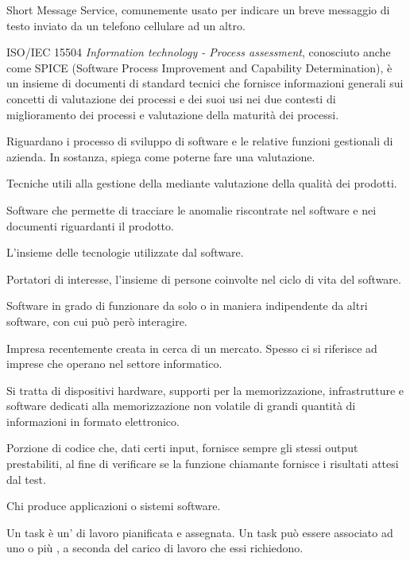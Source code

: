 Short Message Service, comunemente usato per indicare un breve messaggio di testo inviato da un telefono cellulare ad un altro.

ISO/IEC 15504 \emph{Information technology - Process assessment}, conosciuto anche come SPICE (Software Process Improvement and Capability Determination), è un insieme di documenti di standard tecnici che fornisce informazioni generali sui concetti di valutazione dei processi e dei suoi usi nei due contesti di miglioramento dei processi e valutazione della maturità dei processi.

Riguardano i processo di sviluppo di software e le relative funzioni gestionali di azienda. In sostanza, spiega come poterne fare una valutazione.

Tecniche utili alla gestione della  mediante valutazione della qualità dei prodotti.

Software che permette di tracciare le anomalie riscontrate nel software e nei documenti riguardanti il prodotto.

L'insieme delle tecnologie utilizzate dal software.

Portatori di interesse, l'insieme di persone coinvolte nel ciclo di vita del software.

Software in grado di funzionare da solo o in maniera indipendente da altri software, con cui può però interagire.

Impresa recentemente creata in cerca di un mercato. Spesso ci si riferisce ad imprese che operano nel settore informatico.

Si tratta di dispositivi hardware, supporti per la memorizzazione, infrastrutture e software dedicati alla memorizzazione non volatile di grandi quantità di informazioni in formato elettronico.

Porzione di codice che, dati certi input, fornisce sempre gli stessi output prestabiliti, al fine di verificare se la funzione chiamante fornisce i risultati attesi dal test.

Chi produce applicazioni o sistemi software.


Un task è un' di lavoro pianificata e assegnata. Un task può essere associato ad uno o più , a seconda del carico di lavoro che essi richiedono.

